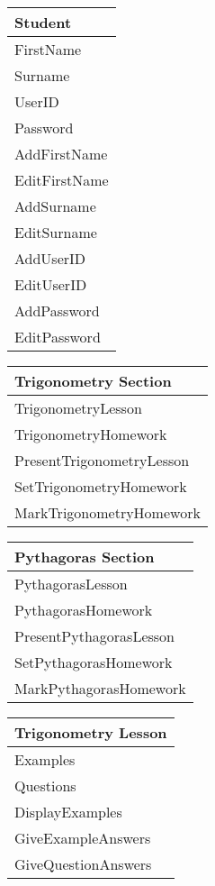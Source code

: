 \begin{center}
\begin{tabular}{|p{5cm}|} \hline
Student \\ \hline
FirstName \\
Surname \\
UserID \\
Password  \\ \hline
AddFirstName \\
EditFirstName \\
AddSurname \\
EditSurname \\
AddUserID \\
EditUserID \\
AddPassword \\
EditPassword \\ \hline
\end{tabular}
\end{center}

\begin{center}
\begin{tabular}{|p{5cm}|} \hline
Trigonometry Section \\ \hline
TrigonometryLesson \\
TrigonometryHomework \\ \hline
PresentTrigonometryLesson \\
SetTrigonometryHomework \\
MarkTrigonometryHomework \\ \hline
\end{tabular}
\end{center}

\begin{center}
\begin{tabular}{|p{5cm}|} \hline
Pythagoras Section \\ \hline
PythagorasLesson \\
PythagorasHomework \\ \hline
PresentPythagorasLesson \\
SetPythagorasHomework \\
MarkPythagorasHomework \\ \hline
\end{tabular}
\end{center}

\begin{center}
\begin{tabular}{|p{5cm}|} \hline
Trigonometry Lesson \\ \hline
Examples \\
Questions \\ \hline
DisplayExamples \\
GiveExampleAnswers \\
GiveQuestionAnswers \\ \hline
\end{tabular}
\end{center}

